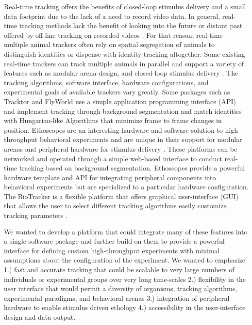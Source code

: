 \documentclass[10pt]{article}
\begin{document}
\begin{multicols}{2}
Real-time tracking offers the benefits of closed-loop stimulus delivery and a small data footprint due to the lack of a need to record video data. In general, real-time tracking methods lack the benefit of looking into the future or distant past offered by off-line tracking on recorded videos \cite{Itskovits_A_2017}. For that reason, real-time multiple animal trackers often rely on spatial segregation of animals to distinguish identities or dispense with identity tracking altogether\cite{Liu_A_2018}. Some existing real-time trackers can track multiple animals in parallel and support a variety of features such as modular arena design, and closed-loop stimulus delivery \cite{Geissmann_Ethoscopes_2017,Straw_Multi_2011,Stowers_Virtual_2017,Chagas_The_2017}. The tracking algorithms, software interface, hardware configurations, and experimental goals of available trackers vary greatly. Some packages such as Tracktor and FlyWorld use a simple application programming interface (API) and implement tracking through background segmentation and match identities with Hungarian-like Algorithms that minimize frame to frame changes in position. Ethoscopes are an interesting hardware and software solution to high-throughput behavioral experiments and are unique in their support for modular arenas and peripheral hardware for stimulus delivery \cite{Geissmann_Ethoscopes_2017}. These platforms can be networked and operated through a simple web-based interface to conduct real-time tracking based on background segmentation. Ethoscopes provide a powerful hardware template and API for integrating peripheral components into behavioral experiments but are specialized to a particular hardware configuration. The BioTracker is a flexible platform that offers graphical user-interface (GUI) that allows the user to select different tracking algorithms easily customize tracking parameters \cite{Mnck_BioTracker_2018}. 

We wanted to develop a platform that could integrate many of these features into a single software package and further build on them to provide a powerful interface for defining custom high-throughput experiments with minimal assumptions about the configuration of the experiment. We wanted to emphasize 1.) fast and accurate tracking that could be scalable to very large numbers of individuals or experimental groups over very long time-scales 2.) flexibility in the user interface that would permit a diversity of organisms, tracking algorithms, experimental paradigms, and behavioral arenas 3.) integration of peripheral hardware to enable stimulus driven ethology 4.) accessibility in the user-interface design and data output. 


\end{multicols}
\end{document}
